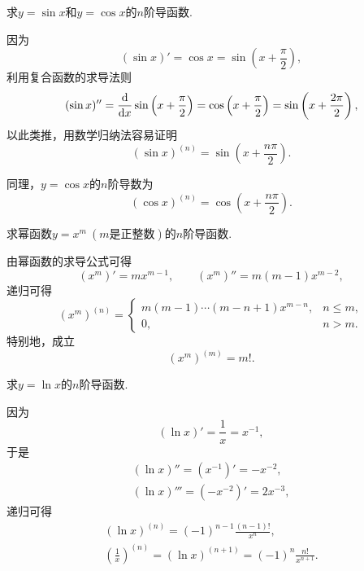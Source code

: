 \begin{example}
求\(y = \sin x\)和\(y = \cos x\)的\(n\)阶导函数.
\begin{solution}
因为\begin{equation*}
	(\sin x)' = \cos x
	= \sin\left(x + \frac\pi2\right),
\end{equation*}
利用复合函数的求导法则\begin{equation*}
	(\sin x)'' = \dv{x} \sin\left(x+\frac\pi2\right)
	= \cos\left(x+\frac\pi2\right)
	= \sin\left(x+\frac{2\pi}2\right),
\end{equation*}
以此类推，用数学归纳法容易证明\begin{equation*}
	(\sin x)^{(n)}
	= \sin\left(x+\frac{n\pi}2\right).
\end{equation*}
\end{solution}
\end{example}
同理，\(y = \cos x\)的\(n\)阶导数为\begin{equation*}
	(\cos x)^{(n)}
	= \cos\left(x+\frac{n\pi}2\right).
\end{equation*}

\begin{example}
求幂函数\(y = x^m\ (\text{$m$是正整数})\)的\(n\)阶导函数.
\begin{solution}
由幂函数的求导公式可得\begin{equation*}
	(x^m)' = m x^{m-1},
	\qquad
	(x^m)'' = m(m-1) x^{m-2},
\end{equation*}
递归可得\begin{equation}
	(x^m)^{(n)} = \left\{ \begin{array}{cl}
		m(m-1)\dotsm(m-n+1) x^{m-n}, & n \leq m, \\
		0, & n > m.
	\end{array} \right.
\end{equation}
特别地，成立\begin{equation}
	(x^m)^{(m)} = m!.
\end{equation}
\end{solution}
\end{example}

\begin{example}
求\(y = \ln x\)的\(n\)阶导函数.
\begin{solution}
因为\begin{equation*}
	(\ln x)' = \frac1x = x^{-1},
\end{equation*}
于是\begin{gather*}
	(\ln x)'' = (x^{-1})' = -x^{-2}, \\
	(\ln x)''' = (-x^{-2})' = 2x^{-3},
\end{gather*}
递归可得\begin{gather}
	(\ln x)^{(n)}
	= (-1)^{n-1} \frac{(n-1)!}{x^n}, \\
	\left(\frac1x\right)^{(n)}
	= (\ln x)^{(n+1)}
	= (-1)^n \frac{n!}{x^{n+1}}.
\end{gather}
\end{solution}
\end{example}

